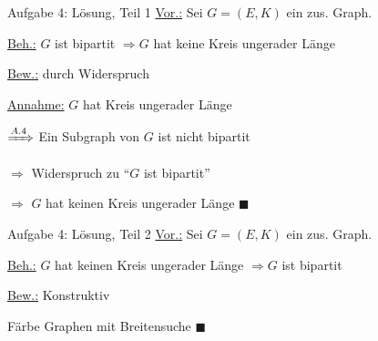 \begin{frame}{Aufgabe 4: Lösung, Teil 1}
\underline{Vor.:} Sei $G = (E, K)$ ein zus. Graph. \pause

\underline{Beh.:} $G$ ist bipartit $\Rightarrow G$ hat keine Kreis ungerader Länge \pause

\underline{Bew.:} durch Widerspruch \pause

\underline{Annahme:} $G$ hat Kreis ungerader Länge \pause

$\xRightarrow[]{A.4}$ Ein Subgraph von $G$ ist nicht bipartit \pause

$\Rightarrow$ Widerspruch zu \enquote{$G$ ist bipartit} \pause

$\Rightarrow$ $G$ hat keinen Kreis ungerader Länge $\blacksquare$
\end{frame}

\begin{frame}{Aufgabe 4: Lösung, Teil 2}
\underline{Vor.:} Sei $G = (E, K)$ ein zus. Graph. \pause

\underline{Beh.:} $G$ hat keinen Kreis ungerader Länge $\Rightarrow G$ ist bipartit \pause

\underline{Bew.:} Konstruktiv \pause

Färbe Graphen mit Breitensuche $\blacksquare$
\end{frame}

